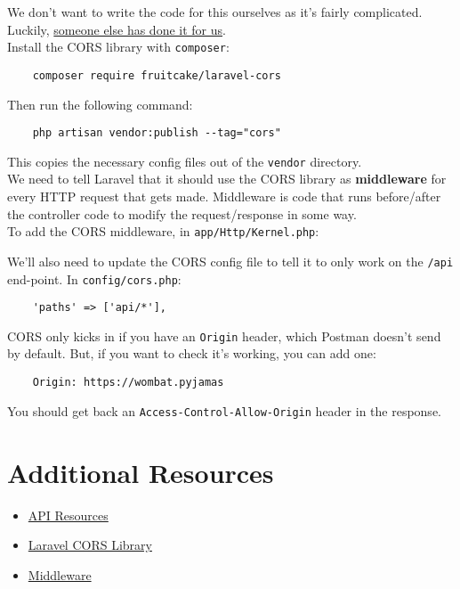 We don't want to write the code for this ourselves as it's fairly complicated. Luckily, \href{https://github.com/fruitcake/laravel-cors}{someone else has done it for us}.
\\

Install the CORS library with \texttt{composer}:

\begin{verbatim}
    composer require fruitcake/laravel-cors
\end{verbatim}

Then run the following command:

\begin{verbatim}
    php artisan vendor:publish --tag="cors"
\end{verbatim}

This copies the necessary config files out of the \texttt{vendor} directory.
\\

We need to tell Laravel that it should use the CORS library as \textbf{middleware} for every HTTP request that gets made. Middleware is code that runs before/after the controller code to modify the request/response in some way.
\\

To add the CORS middleware, in \texttt{app/Http/Kernel.php}:


We'll also need to update the CORS config file to tell it to only work on the \texttt{/api} end-point. In \texttt{config/cors.php}:

\begin{verbatim}
    'paths' => ['api/*'],
\end{verbatim}

CORS only kicks in if you have an \texttt{Origin} header, which Postman doesn't send by default. But, if you want to check it's working, you can add one:

\begin{verbatim}
    Origin: https://wombat.pyjamas
\end{verbatim}

You should get back an \texttt{Access-Control-Allow-Origin} header in the response.



\section{Additional Resources}

\begin{itemize}[leftmargin=*]
    \item \href{https://laravel.com/docs/master/eloquent-resources}{API Resources}
    \item \href{https://github.com/barryvdh/laravel-cors}{Laravel CORS Library}
    \item \href{http://laravel.com/docs/master/middleware}{Middleware}
\end{itemize}
